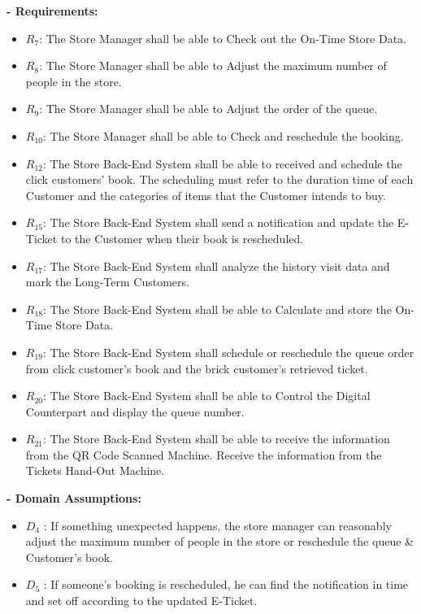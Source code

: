 \documentclass[a4paper,12pt]{report}
\begin{document}
\textbf{- Requirements:}
\begin{itemize}
	
	\item $R_7$: The Store Manager shall be able to Check out the On-Time Store Data.
	\item $R_8$: The Store Manager shall be able to Adjust the maximum number of people in the store. 
	\item $R_9$: The Store Manager shall be able to Adjust the order of the queue.
	\item $R_{10}$: The Store Manager shall be able to Check and reschedule the booking. 
	\item $R_{12}$: The Store Back-End System shall be able to received and schedule the click customers’ book. The scheduling must refer to the duration time of each Customer and the categories of items that the Customer intends to buy.
	\item $R_{15}$: The Store Back-End System shall send a notification and update the E-Ticket to the Customer when their book is rescheduled. 
	\item $R_{17}$: The Store Back-End System shall analyze the history visit data and mark the Long-Term Customers. 
	\item $R_{18}$: The Store Back-End System shall be able to Calculate and store the On-Time Store Data.
	\item $R_{19}$: The Store Back-End System shall schedule or reschedule the queue order from click customer’s book and the brick customer's retrieved ticket.
	\item $R_{20}$: The Store Back-End System shall be able to Control the Digital Counterpart and display the queue number. 
	\item $R_{21}$: The Store Back-End System shall be able to receive the information from the QR Code Scanned Machine. Receive the information from the Tickets Hand-Out Machine. 
\end{itemize}


\textbf{- Domain Assumptions:}
\begin{itemize}
	\item $D_4$ : If something unexpected happens, the store manager can reasonably adjust the maximum number of people in the store or reschedule the queue \& Customer's book.
	\item $D_5$ : If someone’s booking is rescheduled, he can find the notification in time and set off according to the updated E-Ticket.
\end{itemize}
\end{document}
